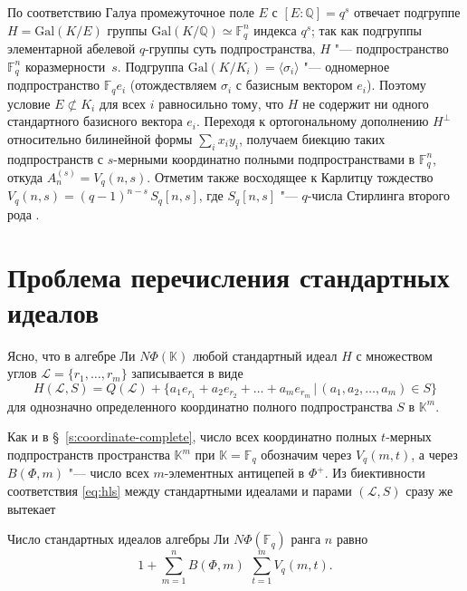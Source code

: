 \documentclass[a4paper,14pt,oneside,openany]{memoir}
\begin{document}
\medskip

По соответствию Галуа промежуточное поле $E$ с $[E:\mathbb{Q}]=q^s$ отвечает
подгруппе $H = \mathrm{Gal}(K/E)$ группы
$\mathrm{Gal}(K/\mathbb{Q})\simeq\mathbb{F}_q^n$ индекса $q^s$; так как
подгруппы элементарной абелевой $q$-группы суть подпространства, $H$ "---
подпространство $\mathbb{F}_q^n$ коразмерности~$s$. Подгруппа
$\mathrm{Gal}(K/K_i)=\langle\sigma_i\rangle$ "--- одномерное подпространство
$\mathbb{F}_q e_i$ (отождествляем $\sigma_i$ с базисным вектором $e_i$).
Поэтому условие $E\not\subset K_i$ для всех $i$ равносильно тому, что $H$ не
содержит ни одного стандартного базисного вектора $e_i$. Переходя к
ортогональному дополнению $H^\perp$ относительно билинейной формы $\sum_i x_i
y_i$, получаем биекцию таких подпространств с $s$-мерными координатно полными
подпространствами в $\mathbb{F}_q^n$, откуда $A_n^{(s)} = V_q(n,s)$. Отметим
также восходящее к Карлитцу тождество $V_q(n,s) = (q-1)^{n-s}\,S_q[n,s]$, где
$S_q[n,s]$ "--- $q$-числа Стирлинга второго рода \cite[предложение~4.2,
тождество~(4.7)]{anne1993}.

\section{Проблема перечисления стандартных идеалов} \label{sec:Problem-1}
Ясно, что в алгебре Ли $N\Phi(\mathbb{K})$ любой стандартный идеал $H$ с
множеством углов $\mathcal{L}=\{r_1,\ldots,r_m\}$ записывается в виде
\begin{equation}\label{eq:hls}
    H(\mathcal{L},S) = Q(\mathcal{L}) + \{ a_1e_{r_1} + a_2e_{r_2}
    + \dots + a_me_{r_m} \,|\, (a_1,a_2,\dots,a_m)\in S \}
\end{equation}
%
для однозначно определенного координатно полного подпространства $S$ в
$\mathbb{K}^m$.

\medskip

Как и в \S~\ref{s:coordinate-complete}, число всех координатно полных
$t$-мерных подпространств пространства $\mathbb{K}^m$ при
$\mathbb{K}=\mathbb{F}_q$ обозначим через $V_q(m,t)$, а через $B(\Phi,m)$ "---
число всех $m$-элементных антицепей в $\Phi^+$. Из биективности соответствия
\eqref{eq:hls} между стандартными идеалами и парами $(\mathcal{L}, S)$ сразу же
вытекает

\begin{lemma}\label{l:enum-stand-id-reduct-BV}
    Число стандартных идеалов алгебры Ли $N\Phi(\mathbb{F}_q)$ ранга $n$ равно
    \[
        1+\sum\limits_{m=1}^{n}B(\Phi,m)\, \ \sum\limits_{t=1}^{m}V_q(m,t).
    \]
\end{lemma}
\end{document}
